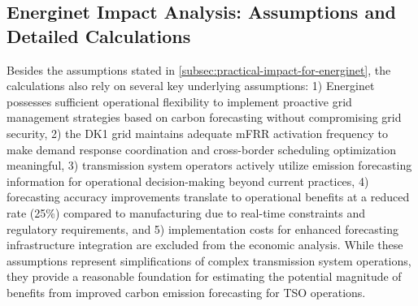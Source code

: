 \clearpage

\thispagestyle{plain}
\subsection{Energinet Impact Analysis: Assumptions and Detailed Calculations}
\label{apdx:energinet-impact-analysis}

Besides the assumptions stated in \autoref{subsec:practical-impact-for-energinet}, the calculations also rely on several key underlying assumptions: 1) Energinet possesses sufficient operational flexibility to implement proactive grid management strategies based on carbon forecasting without compromising grid security, 2) the DK1 grid maintains adequate mFRR activation frequency to make demand response coordination and cross-border scheduling optimization meaningful, 3) transmission system operators actively utilize emission forecasting information for operational decision-making beyond current practices, 4) forecasting accuracy improvements translate to operational benefits at a reduced rate (25\%) compared to manufacturing due to real-time constraints and regulatory requirements, and 5) implementation costs for enhanced forecasting infrastructure integration are excluded from the economic analysis. While these assumptions represent simplifications of complex transmission system operations, they provide a reasonable foundation for estimating the potential magnitude of benefits from improved carbon emission forecasting for TSO operations.

